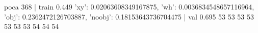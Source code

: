 poca 368 | train 0.449 {'xy': 0.02063608349167875, 'wh': 0.0036834548657116964, 'obj': 0.2362472126703887, 'noobj': 0.18153643736704475} | val 0.695
 53%
 53%
 53%
 53%
 53%
 53%
 53%
 54%
 54%
 54%
